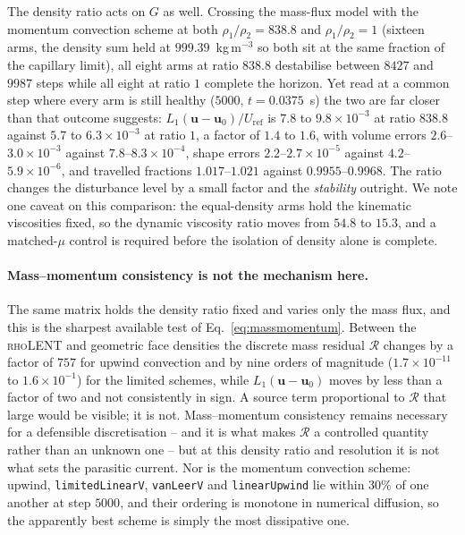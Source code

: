\documentclass[preprint,3p,11pt]{elsarticle}
\newcommand{\uvec}{\mathbf{u}}
\begin{document}
The density ratio acts on $G$ as well. Crossing the mass-flux model with the momentum
convection scheme at both $\rho_1/\rho_2=838.8$ and $\rho_1/\rho_2=1$ (sixteen arms, the
density sum held at $999.39$~kg\,m$^{-3}$ so both sit at the same fraction of the capillary
limit), all eight arms at ratio $838.8$ destabilise between $8427$ and $9987$ steps while
all eight at ratio $1$ complete the horizon. Yet read at a common step where every arm is
still healthy ($5000$, $t=0.0375$~s) the two are far closer than that outcome suggests:
$L_1(\uvec-\uvec_0)/U_{\mathrm{ref}}$ is $7.8$ to $9.8\times10^{-3}$ at ratio $838.8$
against $5.7$ to $6.3\times10^{-3}$ at ratio $1$, a factor of $1.4$ to $1.6$,
with volume errors $2.6$--$3.0\times10^{-3}$ against $7.8$--$8.3\times10^{-4}$, shape errors
$2.2$--$2.7\times10^{-5}$ against $4.2$--$5.9\times10^{-6}$, and travelled fractions
$1.017$--$1.021$ against $0.9955$--$0.9968$. The ratio changes the disturbance level by a
small factor and the \emph{stability} outright. We note one caveat on this comparison: the
equal-density arms hold the kinematic viscosities fixed, so the dynamic viscosity ratio
moves from $54.8$ to $15.3$, and a matched-$\mu$ control is required before the isolation
of density alone is complete.

\paragraph{Mass--momentum consistency is not the mechanism here.} The same matrix holds the
density ratio fixed and varies only the mass flux, and this is the sharpest available test
of Eq.~\eqref{eq:massmomentum}. Between the \textsc{rhoLENT} and geometric face densities
the discrete mass residual $\mathcal R$ changes by a factor of $757$ for upwind convection
and by nine orders of magnitude ($1.7\times10^{-11}$ to $1.6\times10^{-1}$) for the limited
schemes, while $L_1(\uvec-\uvec_0)$ moves by less than a factor of two and not
consistently in sign. A source term proportional to $\mathcal R$ that large would be
visible; it is not. Mass--momentum consistency remains necessary for a defensible
discretisation -- and it is what makes $\mathcal R$ a controlled quantity rather than an
unknown one -- but at this density ratio and resolution it is not what sets the parasitic
current. Nor is the momentum convection scheme: upwind, \texttt{limitedLinearV},
\texttt{vanLeerV} and \texttt{linearUpwind} lie within $30\%$ of one another at step
$5000$, and their ordering is monotone in numerical diffusion, so the apparently best
scheme is simply the most dissipative one.
\end{document}
